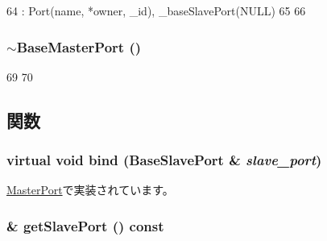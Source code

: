 \begin{DoxyCode}
64     : Port(name, *owner, _id), _baseSlavePort(NULL)
65 {
66 }
\end{DoxyCode}
\hypertarget{classBaseMasterPort_a078b3172e1cb6a5dd1b1608a051ee38b}{
\subsubsection[{$\sim$BaseMasterPort}]{\setlength{\rightskip}{0pt plus 5cm}$\sim${\bf BaseMasterPort} ()}}
\label{classBaseMasterPort_a078b3172e1cb6a5dd1b1608a051ee38b}



\begin{DoxyCode}
69 {
70 }
\end{DoxyCode}


\subsection{関数}
\hypertarget{classBaseMasterPort_a55647ab861a1f8cf8d26df2f402188d7}{
\subsubsection[{bind}]{\setlength{\rightskip}{0pt plus 5cm}virtual void bind ({\bf BaseSlavePort} \& {\em slave\_\-port})}}
\label{classBaseMasterPort_a55647ab861a1f8cf8d26df2f402188d7}


\hyperlink{classMasterPort_a5035def22faf23d50855716f8c9602e2}{MasterPort}で実装されています。\hypertarget{classBaseMasterPort_a557fc10dd63c603dbcb8304d845dd077}{
\subsubsection[{getSlavePort}]{ \& getSlavePort () const}}
\label{classBaseMasterPort_a557fc10dd63c603dbcb8304d845dd077}



